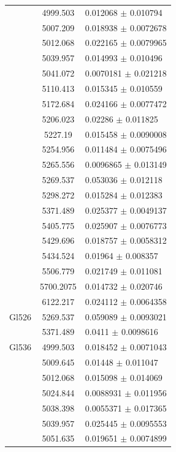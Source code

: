 \begin{longtable}{|c|c|l|}
 & 4999.503 & 0.012068 $\pm$ 0.010794 \\        
 & 5007.209 & 0.018938 $\pm$ 0.0072678 \\       
 & 5012.068 & 0.022165 $\pm$ 0.0079965 \\       
 & 5039.957 & 0.014993 $\pm$ 0.010496 \\        
 & 5041.072 & 0.0070181 $\pm$ 0.021218 \\       
 & 5110.413 & 0.015345 $\pm$ 0.010559 \\        
 & 5172.684 & 0.024166 $\pm$ 0.0077472 \\       
 & 5206.023 & 0.02286 $\pm$ 0.011825 \\         
 & 5227.19 & 0.015458 $\pm$ 0.0090008 \\        
 & 5254.956 & 0.011484 $\pm$ 0.0075496 \\       
 & 5265.556 & 0.0096865 $\pm$ 0.013149 \\       
 & 5269.537 & 0.053036 $\pm$ 0.012118 \\        
 & 5298.272 & 0.015284 $\pm$ 0.012383 \\        
 & 5371.489 & 0.025377 $\pm$ 0.0049137 \\       
 & 5405.775 & 0.025907 $\pm$ 0.0076773 \\       
 & 5429.696 & 0.018757 $\pm$ 0.0058312 \\       
 & 5434.524 & 0.01964 $\pm$ 0.008357 \\         
 & 5506.779 & 0.021749 $\pm$ 0.011081 \\        
 & 5700.2075 & 0.014732 $\pm$ 0.020746 \\       
 & 6122.217 & 0.024112 $\pm$ 0.0064358 \\       
\hline                                          
Gl526 & 5269.537 & 0.059089 $\pm$ 0.0093021 \\  
 & 5371.489 & 0.0411 $\pm$ 0.0098616 \\         
\hline                                          
Gl536 & 4999.503 & 0.018452 $\pm$ 0.0071043 \\  
 & 5009.645 & 0.01448 $\pm$ 0.011047 \\         
 & 5012.068 & 0.015098 $\pm$ 0.014069 \\        
 & 5024.844 & 0.0088931 $\pm$ 0.011956 \\       
 & 5038.398 & 0.0055371 $\pm$ 0.017365 \\       
 & 5039.957 & 0.025445 $\pm$ 0.0095553 \\       
 & 5051.635 & 0.019651 $\pm$ 0.0074899 \\       

\end{longtable}
